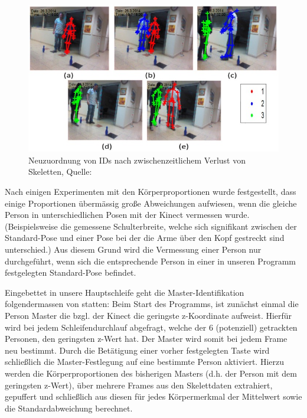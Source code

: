 \begin{figure}
\includegraphics[width=\textwidth]{pictures/sensors-16-01965-g005.jpg}
\caption{Neuzuordnung von IDs nach zwischenzeitlichem \glqq Verlust\grqq{} von Skeletten, Quelle:\cite{bodyprop}}
\label{fig:fehlerk}
\end{figure}

Nach einigen Experimenten mit den Körperproportionen wurde festgestellt, dass einige Proportionen übermässig große Abweichungen aufwiesen, wenn die gleiche Person in unterschiedlichen Posen mit der Kinect vermessen wurde. (Beispielsweise die gemessene Schulterbreite, welche sich signifikant zwischen der Standard-Pose und einer Pose bei der die Arme über den Kopf gestreckt sind unterschied.) Aus diesem Grund wird die Vermessung einer Person nur durchgeführt, wenn sich die entsprechende Person in einer in unseren Programm festgelegten Standard-Pose befindet. \par
Eingebettet in unsere Hauptschleife geht die Master-Identifikation folgendermassen von statten: Beim Start des Programms, ist zunächst einmal die Person Master die bzgl. der Kinect die geringste z-Koordinate aufweist. Hierfür wird bei jedem Schleifendurchlauf abgefragt, welche der 6 (potenziell) getrackten Personen, den geringsten z-Wert hat. Der Master wird somit bei jedem Frame neu bestimmt. Durch die Betätigung einer vorher festgelegten Taste wird schließlich die Master-Festlegung auf eine bestimmte Person aktiviert. Hierzu werden die Körperproportionen des bisherigen Masters (d.h. der Person mit dem geringsten z-Wert), über mehrere Frames aus den Skelettdaten extrahiert, gepuffert und schließlich aus diesen für jedes Körpermerkmal der Mittelwert sowie die Standardabweichung berechnet.
	
	
	